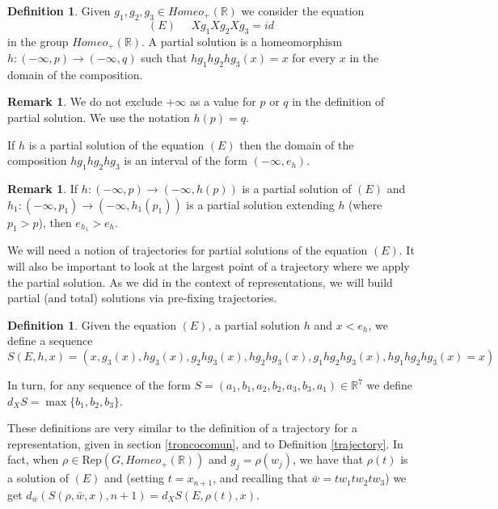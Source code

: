 \documentclass[12pt]{article}
\newcommand{\R}{\mathbb{R}}
\theoremstyle{definition}
\newtheorem{rem}[thm]{Remark}
\newtheorem{defi}[thm]{Definition}
\begin{document}
\begin{defi} Given $g_1,g_2,g_3\in Homeo_{+}(\R)$ we consider the equation 
$$ (E)\text{ }\text{ } Xg_1Xg_2Xg_3=id $$ 
in the group $Homeo_{+}(\R)$. 
A partial solution is a homeomorphism \\
$h:(-\infty,p)\to(-\infty,q)$ such that $hg_1hg_2hg_3(x)=x$ for every $x$ in the domain of the composition. %
\end{defi}


\begin{rem} \label{borde} We do not exclude $+\infty$ as a value for $p$ or $q$ in the definition of partial solution. We use the notation $h(p)=q$.
\end{rem}

If $h$ is a partial solution of the equation $(E)$ then the domain of the composition $hg_1hg_2hg_3$ is an interval of the form $(-\infty,e_h)$.

\begin{rem} If $h:(-\infty,p)\to (-\infty,h(p))$ is a partial solution  of $(E)$
and \\ $h_1:(-\infty,p_1)\to(-\infty,h_1(p_1))$ is a partial solution extending $h$ (where $p_1>p$), then $e_{h_1}>e_h$.
\end{rem}

We will need a notion of trajectories for partial solutions of the equation $(E)$. It will also be important to look at the largest point of a trajectory where we apply the partial solution. As we did in the context of representations, we will build partial (and total) solutions via pre-fixing trajectories.

\begin{defi} Given the equation $(E)$, a partial solution $h$ and $x<e_h$, we define a sequence 
$$S(E,h,x)=(x,g_3(x),hg_3(x),g_2hg_3(x),hg_2hg_3(x),g_1hg_2hg_3(x),hg_1hg_2hg_3(x)=x)$$ 

In turn, for any sequence of the form $S=(a_1,b_1,a_2,b_2,a_3,b_3,a_1)\in\R^7$ we define $d_X S=\max\{b_1,b_2,b_3\}$. 
\end{defi}

These definitions are very similar to the definition of a trajectory for a representation, given in section \ref{troncocomun}, and to Definition \ref{trajectory}. In fact, when $\rho\in \text{Rep}(G,Homeo_{+}(\R))$ and $g_j=\rho(w_j)$, we have that $\rho(t)$ is a solution of $(E)$ and (setting $t=x_{n+1}$, and recalling that $\bar w=tw_1tw_2tw_3$) we get $d_{\bar w}(S(\rho,\bar w,x),n+1)=d_XS(E,\rho(t),x)$. 
\end{document}
